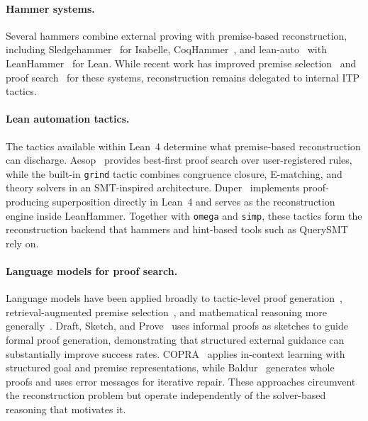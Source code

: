 \paragraph{Hammer systems.}
Several hammers combine external proving with premise-based reconstruction, including Sledgehammer~\cite{bhme2010sledgehammer, blanchette2013extending} for Isabelle, CoqHammer~\cite{czajka2018hammer}, and lean-auto~\cite{qian2025leanauto} with LeanHammer~\cite{zhu2025premise} for Lean.
While recent work has improved premise selection~\cite{mikua2023magnushammer} and proof search~\cite{czechowski2022thor} for these systems, reconstruction remains delegated to internal ITP tactics.

\paragraph{Lean automation tactics.}
The tactics available within Lean~4 determine what premise-based reconstruction can discharge.
Aesop~\cite{limperg2023aesop} provides best-first proof search over user-registered rules, while the built-in \texttt{grind} tactic combines congruence closure, E-matching, and theory solvers in an SMT-inspired architecture.
Duper~\cite{clune2024duper} implements proof-producing superposition directly in Lean~4 and serves as the reconstruction engine inside LeanHammer.
Together with \texttt{omega} and \texttt{simp}, these tactics form the reconstruction backend that hammers and hint-based tools such as QuerySMT~\cite{clune2026hintbased} rely on.

\paragraph{Language models for proof search.}
Language models have been applied broadly to tactic-level proof generation~\cite{polu2020generative, ebner2022hypertree, lu2024proof, ren2025deepseekproverv}, retrieval-augmented premise selection~\cite{anandkumar2023leandojo}, and mathematical reasoning more generally~\cite{azerbayev2023llemma}.
Draft, Sketch, and Prove~\cite{jiang2022draft} uses informal proofs as sketches to guide formal proof generation, demonstrating that structured external guidance can substantially improve success rates.
COPRA~\cite{thakur2023an} applies in-context learning with structured goal and premise representations, while Baldur~\cite{first2023baldur} generates whole proofs and uses error messages for iterative repair.
These approaches circumvent the reconstruction problem but operate independently of the solver-based reasoning that motivates it.

